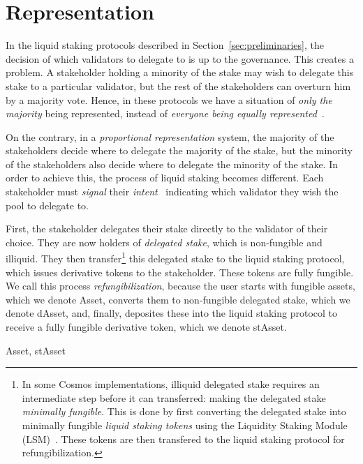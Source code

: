 \section{Representation}

In the liquid staking protocols described in Section~\ref{sec:preliminaries},
the decision of which validators to delegate to is up to the governance.
This creates a problem. A stakeholder holding a minority of the stake
may wish to delegate this stake to a particular validator, but the rest
of the stakeholders can overturn him by a majority vote. Hence, in these
protocols we have a situation of \emph{only the majority} being represented,
instead of \emph{everyone being equally represented}~\cite{mill1862true}.

On the contrary, in a \emph{proportional representation} system, the
majority of the stakeholders decide where to delegate the majority of
the stake, but the minority of the stakeholders also decide where to delegate
the minority of the stake. In order to achieve this, the process of liquid
staking becomes different. Each stakeholder must \emph{signal} their
\emph{intent}~\cite{quicksilver} indicating which validator they wish
the pool to delegate to.

First, the stakeholder delegates their stake
directly to the validator of their choice. They are now holders of \emph{delegated
stake}, which is non-fungible and illiquid. They then
transfer\footnote{In some Cosmos implementations, illiquid delegated stake requires an intermediate
step before it can transferred: making the delegated stake \emph{minimally fungible}.
This is done by first converting the delegated stake into minimally fungible
\emph{liquid staking tokens} using the Liquidity Staking Module (LSM)~\cite{liquidity-staking-module}.
These tokens are then transfered to the liquid staking protocol for refungibilization.}
this delegated stake to the liquid staking protocol, which issues derivative
tokens to the stakeholder. These tokens are fully fungible. We call this
process \emph{refungibilization}, because the user starts with fungible assets,
which we denote \textsf{Asset}, converts them to non-fungible delegated stake,
which we denote \textsf{dAsset}, and, finally, deposites these into the liquid
staking protocol to receive a fully fungible derivative token, which we denote
\textsf{stAsset}.

Asset, stAsset

